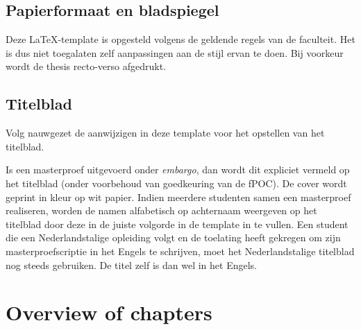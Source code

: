 \subsection{Papierformaat en bladspiegel}
Deze LaTeX-template is opgesteld volgens de geldende regels van de faculteit. Het is dus niet toegalaten zelf aanpassingen aan de stijl ervan te doen. Bij voorkeur wordt de thesis recto-verso afgedrukt.

\subsection{Titelblad}
Volg nauwgezet de aanwijzigen in deze template voor het opstellen van het titelblad.

Is een masterproef uitgevoerd onder \textit{embargo}, dan wordt dit expliciet vermeld op het titelblad (onder voorbehoud van goedkeuring van de fPOC). De cover wordt geprint in kleur op wit papier. Indien meerdere studenten samen een masterproef realiseren, worden de namen alfabetisch op achternaam weergeven op het titelblad door deze in de juiste volgorde in de template in te vullen. Een student die een Nederlandstalige opleiding volgt en de toelating heeft gekregen om zijn masterproefscriptie in het Engels te schrijven, moet het Nederlandstalige titelblad nog steeds gebruiken. De titel zelf is dan wel in het Engels.

\section{Overview of chapters}